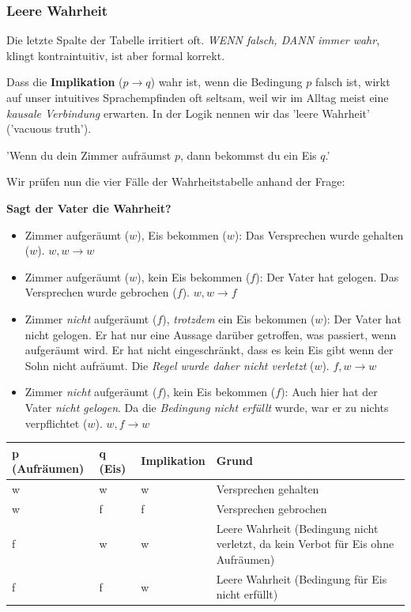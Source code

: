 \documentclass[parskip=half,a4paper,11pt]{scrreprt}
\begin{document}
\subsubsection{Leere Wahrheit}
Die letzte Spalte der Tabelle irritiert oft. \textit{WENN falsch, DANN immer wahr}, klingt kontraintuitiv, ist aber formal korrekt. 

Dass die \textbf{Implikation} ($p \rightarrow q$) wahr ist, wenn die Bedingung $p$ falsch ist, wirkt auf unser intuitives Sprachempfinden oft seltsam, weil wir im Alltag meist eine \textit{kausale Verbindung }erwarten. 
In der Logik nennen wir das 'leere Wahrheit' ('vacuous truth').

'Wenn du dein Zimmer aufräumst $p$, dann bekommst du ein Eis $q$.'

Wir prüfen nun die vier Fälle der Wahrheitstabelle anhand der Frage:

\textbf{Sagt der Vater die Wahrheit?}

\begin{itemize}
    \item Zimmer aufgeräumt ($w$), Eis bekommen ($w$): Das Versprechen wurde gehalten ($w$). $w, w \rightarrow w$
    \item Zimmer aufgeräumt ($w$), kein Eis bekommen ($f$): Der Vater hat gelogen. Das Versprechen wurde gebrochen ($f$). $w, w \rightarrow f$
    \item Zimmer \textit{nicht} aufgeräumt ($f$), \textit{trotzdem} ein Eis bekommen ($w$): Der Vater hat nicht gelogen. Er hat nur eine Aussage darüber getroffen, was passiert, wenn aufgeräumt wird. Er hat nicht eingeschränkt, dass es kein Eis gibt wenn der Sohn nicht aufräumt. Die \textit{Regel wurde daher nicht verletzt} ($w$). $f, w \rightarrow w$
    \item Zimmer \textit{nicht} aufgeräumt ($f$), kein Eis bekommen ($f$): Auch hier hat der Vater \textit{nicht gelogen}. Da die \textit{Bedingung nicht erfüllt} wurde, war er zu nichts verpflichtet ($w$). $w, f \rightarrow w$ \\
\end{itemize}

\begin{table}[h] 
    \centering 
    \begin{tabular}{lllp{5cm}} \toprule
    \textbf{p (Aufräumen)} & \textbf{q (Eis)} & \textbf{Implikation} & \textbf{Grund} \\ \midrule 
    w & w & w & Versprechen gehalten \\ 
    w & f & f & Versprechen gebrochen \\ 
    f & w & w & Leere Wahrheit (Bedingung nicht verletzt, da kein Verbot für Eis ohne Aufräumen) \\ 
    f & f & w & Leere Wahrheit (Bedingung für Eis nicht erfüllt) \\ \bottomrule 
    \end{tabular}
\end{table}
\end{document}

